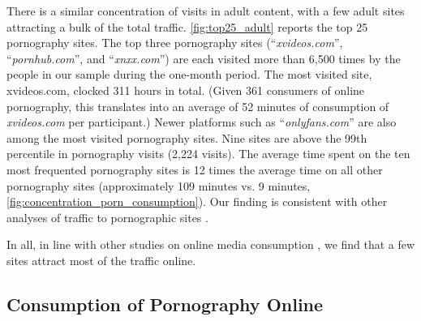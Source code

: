 \documentclass[12pt,twoside]{article}
\begin{document}
There is a similar concentration of visits in adult content, with a few adult sites attracting a bulk of the total traffic. \cref{fig:top25_adult} reports the top 25 pornography sites. The top three pornography sites (``\textit{xvideos.com}'', ``\textit{pornhub.com}'', and ``\textit{xnxx.com}'') are each visited more than 6,500 times by the people in our sample during the one-month period. The most visited site, xvideos.com, clocked 311 hours in total. (Given 361 consumers of online pornography, this translates into an average of 52 minutes of consumption of \textit{xvideos.com} per participant.) Newer platforms such as ``\textit{onlyfans.com}'' are also among the most visited pornography sites. Nine sites are above the 99th percentile in pornography visits (2,224 visits). The average time spent on the ten most frequented pornography sites is 12 times the average time on all other pornography sites (approximately 109 minutes vs. 9 minutes, \cref{fig:concentration_porn_consumption}). Our finding is consistent with other analyses of traffic to pornographic sites \cite{webporn}.

In all, in line with other studies on online media consumption \citep{Dewan2004-tt, hindman2009myth, webporn}, we find that a few sites attract most of the traffic online.

\subsection{Consumption of Pornography Online}
\label{subsec:concentration_in_porn}
\end{document}
